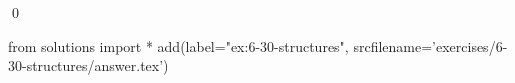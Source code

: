 
\begin{ex}
  \label{ex:6-30-structures}
  
  \qed
\end{ex}
\begin{python0}
from solutions import *
add(label="ex:6-30-structures",
    srcfilename='exercises/6-30-structures/answer.tex')
\end{python0}
